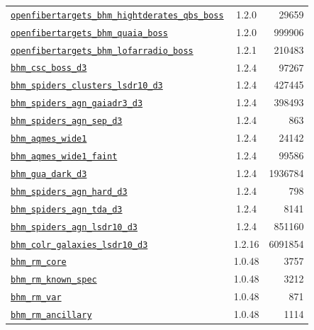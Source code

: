 \begin{table}[ht]
\begin{tabular}{lcr}
\hyperref[openfibertargets_bhm_hightderates_qbs_boss_plan1.2.0]{\texttt{openfibertargets\_bhm\_hightderates\_qbs\_boss}} & 1.2.0 & 29659 \\
\hyperref[openfibertargets_bhm_quaia_boss_plan1.2.0]{\texttt{openfibertargets\_bhm\_quaia\_boss}} & 1.2.0 & 999906 \\
\hyperref[openfibertargets_bhm_lofarradio_boss_plan1.2.1]{\texttt{openfibertargets\_bhm\_lofarradio\_boss}} & 1.2.1 & 210483 \\
\hyperref[bhm_csc_boss_d3_plan1.2.4]{\texttt{bhm\_csc\_boss\_d3}} & 1.2.4 & 97267 \\
\hyperref[bhm_spiders_clusters_lsdr10_d3_plan1.2.4]{\texttt{bhm\_spiders\_clusters\_lsdr10\_d3}} & 1.2.4 & 427445 \\
\hyperref[bhm_spiders_agn_gaiadr3_d3_plan1.2.4]{\texttt{bhm\_spiders\_agn\_gaiadr3\_d3}} & 1.2.4 & 398493 \\
\hyperref[bhm_spiders_agn_sep_d3_plan1.2.4]{\texttt{bhm\_spiders\_agn\_sep\_d3}} & 1.2.4 & 863 \\
\hyperref[bhm_aqmes_wide1_plan1.2.4]{\texttt{bhm\_aqmes\_wide1}} & 1.2.4 & 24142 \\
\hyperref[bhm_aqmes_wide1_faint_plan1.2.4]{\texttt{bhm\_aqmes\_wide1\_faint}} & 1.2.4 & 99586 \\
\hyperref[bhm_gua_dark_d3_plan1.2.4]{\texttt{bhm\_gua\_dark\_d3}} & 1.2.4 & 1936784 \\
\hyperref[bhm_spiders_agn_hard_d3_plan1.2.4]{\texttt{bhm\_spiders\_agn\_hard\_d3}} & 1.2.4 & 798 \\
\hyperref[bhm_spiders_agn_tda_d3_plan1.2.4]{\texttt{bhm\_spiders\_agn\_tda\_d3}} & 1.2.4 & 8141 \\
\hyperref[bhm_spiders_agn_lsdr10_d3_plan1.2.4]{\texttt{bhm\_spiders\_agn\_lsdr10\_d3}} & 1.2.4 & 851160 \\
\hyperref[bhm_colr_galaxies_lsdr10_d3_plan1.2.16]{\texttt{bhm\_colr\_galaxies\_lsdr10\_d3}} & 1.2.16 & 6091854 \\
\hyperref[bhm_rm_core_plan1.0.48]{\texttt{bhm\_rm\_core}} & 1.0.48 & 3757 \\
\hyperref[bhm_rm_known_spec_plan1.0.48]{\texttt{bhm\_rm\_known\_spec}} & 1.0.48 & 3212 \\
\hyperref[bhm_rm_var_plan1.0.48]{\texttt{bhm\_rm\_var}} & 1.0.48 & 871 \\
\hyperref[bhm_rm_ancillary_plan1.0.48]{\texttt{bhm\_rm\_ancillary}} & 1.0.48 & 1114 \\

\hline
\end{tabular}
\end{table}
